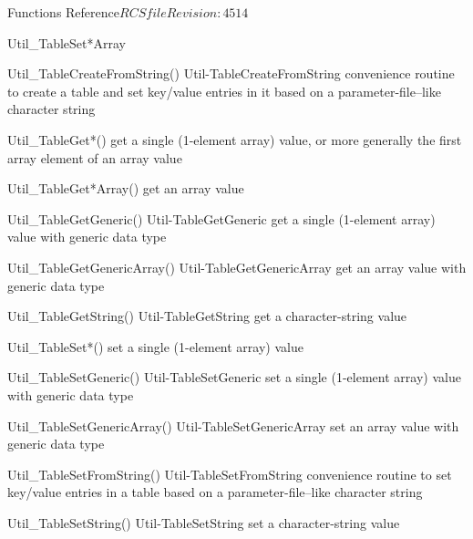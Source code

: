 \begin{cactuspart}{ Functions Reference}{$RCSfile$}{$Revision: 4514 $}
\begin{FunctionDescription}{Util\_TableSet*Array}
\begin{SeeAlsoSection}
\begin{SeeAlso2} {Util\_TableCreateFromString()} {Util-TableCreateFromString}
convenience routine to create a table and set key/value entries
in it based on a parameter-file--like character string
\end{SeeAlso2}
\begin{SeeAlso}{Util\_TableGet*()}
get a single (1-element array) value,
or more generally the first array element of an array value
\end{SeeAlso}
\begin{SeeAlso}{Util\_TableGet*Array()}
get an array value
\end{SeeAlso}
\begin{SeeAlso2} {Util\_TableGetGeneric()} {Util-TableGetGeneric}
get a single (1-element array) value with generic data type
\end{SeeAlso2}
\begin{SeeAlso2} {Util\_TableGetGenericArray()} {Util-TableGetGenericArray}
get an array value with generic data type
\end{SeeAlso2}
\begin{SeeAlso2} {Util\_TableGetString()} {Util-TableGetString}
get a character-string value
\end{SeeAlso2}
\begin{SeeAlso}{Util\_TableSet*()}
set a single (1-element array) value
\end{SeeAlso}
\begin{SeeAlso2} {Util\_TableSetGeneric()} {Util-TableSetGeneric}
set a single (1-element array) value with generic data type
\end{SeeAlso2}
\begin{SeeAlso2} {Util\_TableSetGenericArray()} {Util-TableSetGenericArray}
set an array value with generic data type
\end{SeeAlso2}
\begin{SeeAlso2} {Util\_TableSetFromString()} {Util-TableSetFromString}
convenience routine to set key/value entries in a table based on a
parameter-file--like character string
\end{SeeAlso2}
\begin{SeeAlso2} {Util\_TableSetString()} {Util-TableSetString}
set a character-string value
\end{SeeAlso2}
\end{SeeAlsoSection}


\end{FunctionDescription}
\end{cactuspart}
